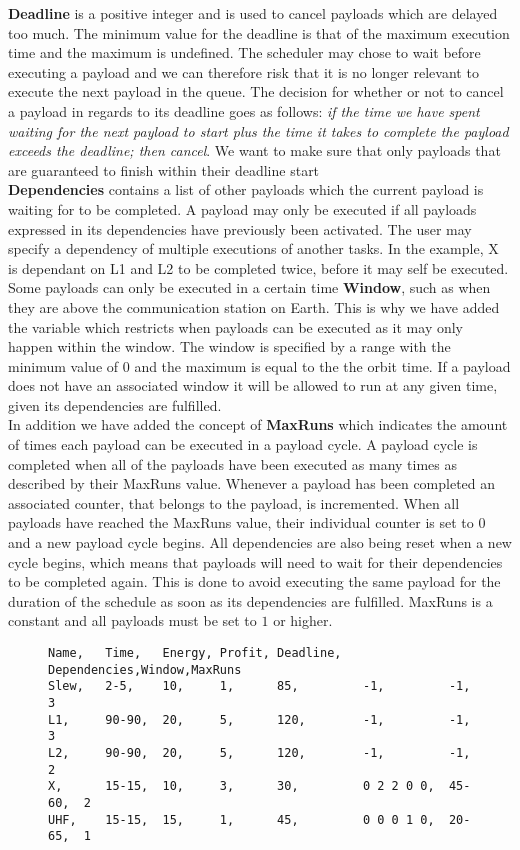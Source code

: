 \textbf{Deadline} is a positive integer and is used to cancel payloads which are delayed too much. The minimum value for the deadline is that of the maximum execution time and the maximum is undefined. The scheduler may chose to wait before executing a payload and we can therefore risk that it is no longer relevant to execute the next payload in the queue.
The decision for whether or not to cancel a payload in regards to its deadline goes as follows: \textit{if the time we have spent waiting for the next payload to start plus the time it takes to complete the payload exceeds the deadline; then cancel}. We want to make sure that only payloads that are guaranteed to finish within their deadline start\\
\textbf{Dependencies} contains a list of other payloads which the current payload is waiting for to be completed. A payload may only be executed if all payloads expressed in its dependencies have previously been activated. The user may specify a dependency of multiple executions of another tasks. In the example, X is dependant on L1 and L2 to be completed twice, before it may self be executed.\\
Some payloads can only be executed in a certain time \textbf{Window}, such as when they are above the communication station on Earth.
This is why we have added the variable which restricts when payloads can be executed as it may only happen within the window. The window is specified by a range with the minimum value of 0 and the maximum is equal to the the orbit time. If a payload does not have an associated window it will be allowed to run at any given time, given its dependencies are fulfilled.\\
In addition we have added the concept of \textbf{MaxRuns} which indicates the amount of times each payload can be executed in a payload cycle. A payload cycle is completed when all of the payloads have been executed as many times as described by their MaxRuns value. Whenever a payload has been completed an associated counter, that belongs to the payload, is incremented. When all payloads have reached the MaxRuns value, their individual counter is set to $0$ and a new payload cycle begins. All dependencies are also being reset when a new cycle begins, which means that payloads will need to wait for their dependencies to be completed again. This is done to avoid executing the same payload for the duration of the schedule as soon as its dependencies are fulfilled. MaxRuns is a constant and all payloads must be set to $1$ or higher.
\begin{figure}[H]
\begin{lstlisting}[caption={Example of how five payloads can be defined}, label=lst:csv, language=text]
Name,	Time,	Energy,	Profit,	Deadline,	Dependencies,Window,MaxRuns
Slew,	2-5,	10,		1,		85,			-1,			-1,		3
L1,		90-90,	20,		5,		120,		-1,			-1,		3
L2,		90-90,	20,		5,		120,		-1,			-1,		2
X,		15-15,	10,		3,		30,			0 2 2 0 0,	45-60,	2
UHF,	15-15,	15,		1,		45,			0 0 0 1 0,	20-65,	1
\end{lstlisting}
\end{figure}

